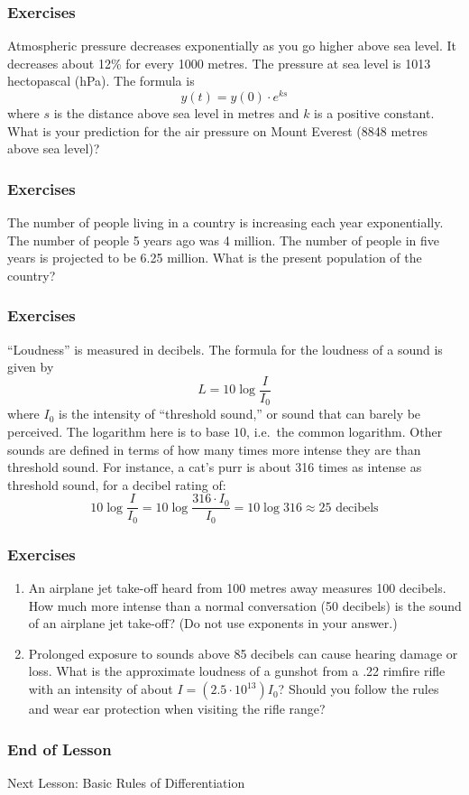 \documentclass[xcolor=dvipsnames]{beamer}
\begin{document}
\begin{frame}
  \frametitle{Exercises}
  {\ubung} Atmospheric pressure decreases exponentially as you go higher
above sea level. It decreases about 12\% for every 1000 metres. The
pressure at sea level is 1013 hectopascal (hPa). The formula is
\begin{equation}
  \label{eq:oopohtee}
  y(t)=y(0)\cdot{}e^{ks}
\end{equation}
where $s$ is the distance above sea level in metres and $k$ is a
positive constant. What is your prediction for the air pressure on
Mount Everest (8848 metres above sea level)?
\end{frame}

\begin{frame}
  \frametitle{Exercises}
  {\ubung} The number of people living in a country is increasing each year
exponentially. The number of people 5 years ago was 4 million. The
number of people in five years is projected to be 6.25 million. What
is the present population of the country?
\end{frame}

\begin{frame}
  \frametitle{Exercises}
  {\ubung} ``Loudness'' is measured in decibels. The formula for the loudness
of a sound is given by 
\begin{equation}
\label{eq:thaixazu}
L=10\log\frac{I}{I_{0}}
\end{equation}
where $I_{0}$ is the intensity of ``threshold sound,'' or sound that
can barely be perceived. The logarithm here is to base $10$, i.e.\ the
common logarithm. Other sounds are defined in terms of how many times
more intense they are than threshold sound. For instance, a cat's purr
is about 316 times as intense as threshold sound, for a decibel rating
of:
\begin{equation}
  \label{eq:ahgheeha}
  10\log\frac{I}{I_{0}}=10\log\frac{316\cdot{}I_{0}}{I_{0}}=10\log{}316\approx{}25\mbox{ decibels}
\end{equation}
\end{frame}

\begin{frame}
  \frametitle{Exercises}
  \begin{enumerate}
  \item An airplane jet take-off heard from 100 metres away measures 100
decibels. How much more intense than a normal conversation (50
decibels) is the sound of an airplane jet take-off? (Do not use
exponents in your answer.)
\item Prolonged exposure to sounds above 85 decibels can cause hearing
damage or loss. What is the approximate loudness of a gunshot from a
.22 rimfire rifle with an intensity of about
$I=(2.5\cdot{}10^{13})I_{0}$? Should you follow the rules and wear ear
protection when visiting the rifle range?
  \end{enumerate}
\end{frame}

\begin{frame}
  \frametitle{End of Lesson}
Next Lesson: Basic Rules of Differentiation
\end{frame}
\end{document}
